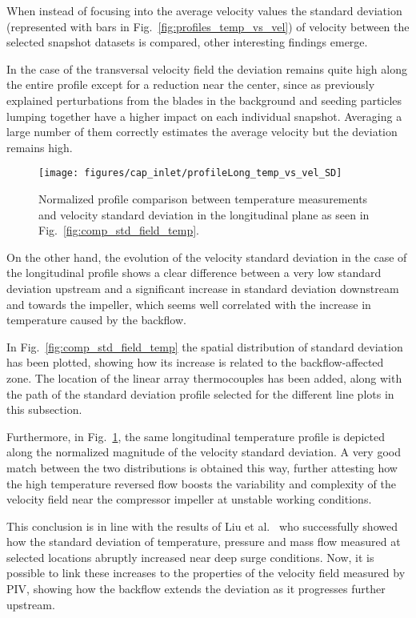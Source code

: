 When instead of focusing into the average velocity values the standard deviation (represented with bars in Fig.~\ref{fig:profiles_temp_vs_vel}) of velocity between the selected snapshot datasets is compared, other interesting findings emerge.

In the case of the transversal velocity field the deviation remains quite high along the entire profile except for a reduction near the center, since as previously explained perturbations from the blades in the background and seeding particles lumping together have a higher impact on each individual snapshot. Averaging a large number of them correctly estimates the average velocity but the deviation remains high.

\begin{figure}[thb!]
\centering
\texttt{[image: figures/cap\_inlet/profileLong\_temp\_vs\_vel\_SD]}
\caption[Normalized profile comparison of $\sigma$ vel. vs. temp.]{Normalized profile comparison between temperature measurements and velocity standard deviation in the longitudinal plane as seen in Fig.~\ref{fig:comp_std_field_temp}.}
\label{fig:profiles_temp_vs_vel_long_SD}
\end{figure}

On the other hand, the evolution of the velocity standard deviation in the case of the longitudinal profile shows a clear difference between a very low standard deviation upstream and a significant increase in standard deviation downstream and towards the impeller, which seems well correlated with the increase in temperature caused by the backflow.

In Fig.~\ref{fig:comp_std_field_temp} the spatial distribution of standard deviation has been plotted, showing how its increase is related to the backflow-affected zone. The location of the linear array thermocouples has been added, along with the path of the standard deviation profile selected for the different line plots in this subsection.

Furthermore, in Fig.~\ref{fig:profiles_temp_vs_vel_long_SD}, the same longitudinal temperature profile is depicted along the normalized magnitude of the velocity standard deviation. A very good match between the two distributions is obtained this way, further attesting how the high temperature reversed flow boosts the variability and complexity of the velocity field near the compressor impeller at unstable working conditions.

This conclusion is in line with the results of Liu et al.~\cite{liu2013methods} who successfully showed how the standard deviation of temperature, pressure and mass flow measured at selected locations abruptly increased near deep surge conditions. Now, it is possible to link these increases to the properties of the velocity field measured by PIV, showing how the backflow extends the deviation as it progresses further upstream.

